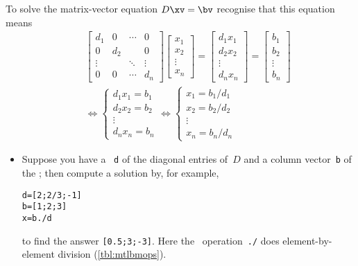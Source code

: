 \begin{compute}
To solve the matrix-vector equation \(D\xv=\bv\) recognise that this equation means
\begin{eqnarray}&&
\begin{bmatrix} d_1&0&\cdots&0
\\0&d_2&&0
\\\vdots&&\ddots&\vdots
\\0&0&\cdots&d_n \end{bmatrix}
\begin{bmatrix} x_1\\x_2\\\vdots\\x_n \end{bmatrix}
=\begin{bmatrix} d_1x_1\\d_2x_2\\\vdots\\d_nx_n \end{bmatrix}
=\begin{bmatrix} b_1\\b_2\\\vdots\\b_n \end{bmatrix}
\nonumber\\&&\iff
\begin{cases} d_1x_1=b_1\\d_2x_2=b_2\\\vdots\\d_nx_n=b_n \end{cases}
\iff
\begin{cases} x_1=b_1/d_1\\x_2=b_2/d_2\\\vdots\\x_n=b_n/d_n \end{cases}
\label{eq:ddslin}
\end{eqnarray}
\begin{itemize}
\item Suppose you have a ~\verb|d| of the diagonal entries of~\(D\) and a column vector~\verb|b| of the \rhs; then compute a solution by, for example,
\setbox\ajrqrbox\hbox{}%
\marginpar{\usebox{\ajrqrbox\\[2ex]}}%
\begin{verbatim}
d=[2;2/3;-1]
b=[1;2;3]
x=b./d
\end{verbatim}
to find the answer \verb|[0.5;3;-3]|.
Here the \script\ operation~\verb|./| does  element-by-element division (\autoref{tbl:mtlbmops}).


\end{itemize}
\end{compute}
